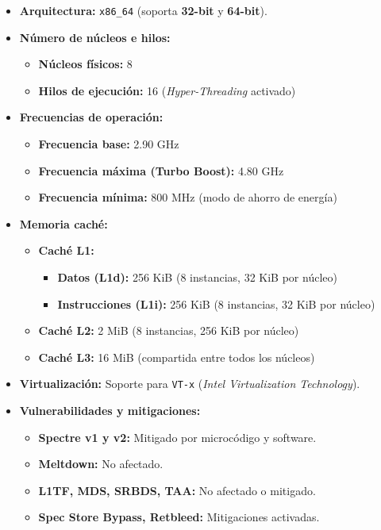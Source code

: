 \documentclass[conference]{IEEEtran}
\begin{document}
\begin{itemize}
    \item \textbf{Arquitectura:} \texttt{x86\_64} (soporta \textbf{32-bit} y \textbf{64-bit}).
    \item \textbf{Número de núcleos e hilos:} 
    \begin{itemize}
        \item \textbf{Núcleos físicos:} 8
        \item \textbf{Hilos de ejecución:} 16 (\textit{Hyper-Threading} activado)
    \end{itemize}
    \item \textbf{Frecuencias de operación:} 
    \begin{itemize}
        \item \textbf{Frecuencia base:} 2.90 GHz
        \item \textbf{Frecuencia máxima (Turbo Boost):} 4.80 GHz
        \item \textbf{Frecuencia mínima:} 800 MHz (modo de ahorro de energía)
    \end{itemize}
    \item \textbf{Memoria caché:} 
    \begin{itemize}
        \item \textbf{Caché L1:} 
        \begin{itemize}
            \item \textbf{Datos (L1d):} 256 KiB (8 instancias, 32 KiB por núcleo)
            \item \textbf{Instrucciones (L1i):} 256 KiB (8 instancias, 32 KiB por núcleo)
        \end{itemize}
        \item \textbf{Caché L2:} 2 MiB (8 instancias, 256 KiB por núcleo)
        \item \textbf{Caché L3:} 16 MiB (compartida entre todos los núcleos)
    \end{itemize}
    \item \textbf{Virtualización:} Soporte para \texttt{VT-x} (\textit{Intel Virtualization Technology}).
    \item \textbf{Vulnerabilidades y mitigaciones:} 
    \begin{itemize}
        \item \textbf{Spectre v1 y v2:} Mitigado por microcódigo y software.
        \item \textbf{Meltdown:} No afectado.
        \item \textbf{L1TF, MDS, SRBDS, TAA:} No afectado o mitigado.
        \item \textbf{Spec Store Bypass, Retbleed:} Mitigaciones activadas.
    \end{itemize}
\end{itemize}
\end{document}
